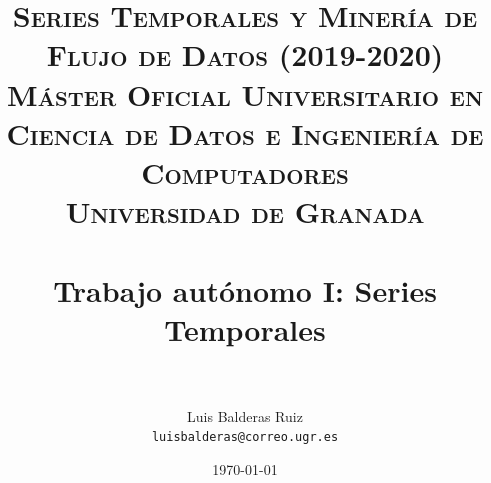 
\graphicspath{ {./images/} }
\usepackage{subcaption}
\usepackage{hyperref}
\usepackage{soul}



\title{	
\normalfont \normalsize 
\textsc{\textbf{Series Temporales y Minería de Flujo de Datos (2019-2020)} \\ Máster Oficial Universitario en Ciencia de Datos e Ingeniería de Computadores \\ Universidad de Granada} \\ [25pt] %
\horrule{0.5pt} \\[0.4cm] %
\huge Trabajo autónomo I: Series Temporales \\ %
\horrule{2pt} \\[0.5cm] %
}

\author{Luis Balderas Ruiz \\ \texttt{luisbalderas@correo.ugr.es}} 


\date{\normalsize\today} %




\maketitle %

\newpage %

\tableofcontents %

\listoffigures


\newpage

%

